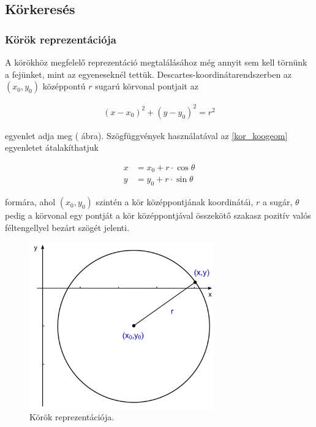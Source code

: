 \subsection{Körkeresés}\label{sect:korkereses}

\subsubsection{Körök reprezentációja}\label{sect:korok_reprezentacioja}

A körökhöz megfelelő reprezentáció megtalálásához még annyit sem kell törnünk a fejünket, mint az egyeneseknél tettük. Descartes-koordinátarendszerben az $ (x_{0}, y_{0}) $ középpontú $ r $ sugarú körvonal pontjait az

\begin{align}\label{eq:kor_koogeom}
( x - x_{0})^{2} + (y - y_{0})^2 = r^2
\end{align}

egyenlet adja meg ( ábra). Szögfüggvények használatával az \eqref{kor_koogeom} egyenletet átalakíthatjuk

\begin{align}\label{eq:kor_param}
x &= x_{0} + r \cdot \cos \theta \nonumber \\
y &= y_{0} + r \cdot \sin \theta
\end{align}

formára, ahol $ (x_{0}, y_{0}) $ szintén a kör középpontjának koordinátái, $ r $ a sugár, $ \theta $ pedig a körvonal egy pontját a kör középpontjával összekötő szakasz pozitív valós féltengellyel bezárt szögét jelenti.

\begin{figure}[!ht]
\centering
\includegraphics[width=80mm, keepaspectratio]{figures/repr_circle.png}
\caption{Körök reprezentációja.}
\label{fig:repr_circle}
\end{figure}


